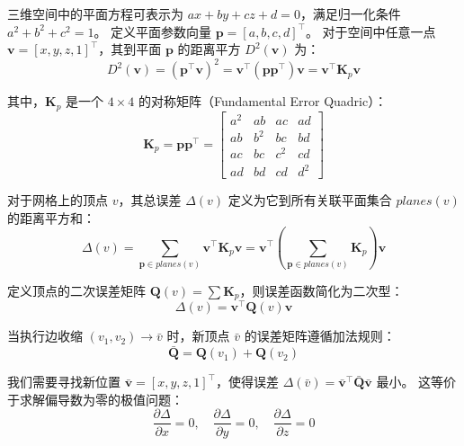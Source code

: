\documentclass[12pt]{article}
\begin{document}
三维空间中的平面方程可表示为 $ax + by + cz + d = 0$，满足归一化条件 $a^2+b^2+c^2=1$。
定义平面参数向量 $\mathbf{p} = [a, b, c, d]^\top$。
对于空间中任意一点 $\mathbf{v} = [x, y, z, 1]^\top$，其到平面 $\mathbf{p}$ 的距离平方 $D^2(\mathbf{v})$ 为：
\begin{equation}
D^2(\mathbf{v}) = (\mathbf{p}^\top \mathbf{v})^2 = \mathbf{v}^\top (\mathbf{p}\mathbf{p}^\top) \mathbf{v} = \mathbf{v}^\top \mathbf{K}_p \mathbf{v}
\end{equation}

其中，$\mathbf{K}_p$ 是一个 $4 \times 4$ 的对称矩阵（Fundamental Error Quadric）：
\begin{equation}
\mathbf{K}_p = \mathbf{p}\mathbf{p}^\top = 
\begin{bmatrix}
a^2 & ab & ac & ad \\
ab & b^2 & bc & bd \\
ac & bc & c^2 & cd \\
ad & bd & cd & d^2
\end{bmatrix}
\end{equation}

对于网格上的顶点 $v$，其总误差 $\Delta(v)$ 定义为它到所有关联平面集合 $planes(v)$ 的距离平方和：
\begin{equation}
\Delta(v) = \sum_{\mathbf{p} \in planes(v)} \mathbf{v}^\top \mathbf{K}_p \mathbf{v} 
= \mathbf{v}^\top \left( \sum_{\mathbf{p} \in planes(v)} \mathbf{K}_p \right) \mathbf{v}
\end{equation}

定义顶点的二次误差矩阵 $\mathbf{Q}(v) = \sum \mathbf{K}_p$，则误差函数简化为二次型：
\begin{equation}
\Delta(v) = \mathbf{v}^\top \mathbf{Q}(v) \mathbf{v}
\end{equation}

当执行边收缩 $(v_1, v_2) \to \bar{v}$ 时，新顶点 $\bar{v}$ 的误差矩阵遵循加法规则：
\begin{equation}
\bar{\mathbf{Q}} = \mathbf{Q}(v_1) + \mathbf{Q}(v_2)
\end{equation}

我们需要寻找新位置 $\bar{\mathbf{v}} = [x, y, z, 1]^\top$，使得误差 $\Delta(\bar{v}) = \bar{\mathbf{v}}^\top \bar{\mathbf{Q}} \bar{\mathbf{v}}$ 最小。
这等价于求解偏导数为零的极值问题：
\begin{equation}
\frac{\partial \Delta}{\partial x} = 0, \quad \frac{\partial \Delta}{\partial y} = 0, \quad \frac{\partial \Delta}{\partial z} = 0
\end{equation}
\end{document}
